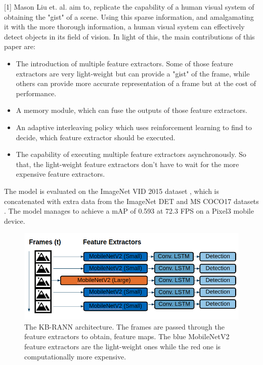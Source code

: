 \documentclass[conference]{IEEEtran}
\begin{document}
[1] Mason Liu et. al. aim to, replicate the capability of a human visual system of obtaining the "gist" of a scene. Using this sparse information, and amalgamating it with the more thorough information, a human visual system can effectively detect objects in its field of vision. In light of this, the main contributions of this paper are:
\begin{itemize}
	\item The introduction of multiple feature extractors. Some of those feature extractors are very light-weight but can provide a "gist" of the frame, while others can provide more accurate representation of a frame but at the cost of performance.
	\item A memory module, which can fuse the outputs of those feature extractors.
	\item An adaptive interleaving policy which uses reinforcement learning to find to decide, which feature extractor should be executed.
	\item The capability of executing multiple feature extractors asynchronously. So that, the light-weight feature extractors don't have to wait for the more expensive feature extractors.
\end{itemize}
The model is evaluated on the ImageNet VID 2015 dataset \cite{b35}, which is concatenated with extra data from the ImageNet DET \cite{b35} and MS COCO17 datasets \cite{b31}. The model manages to achieve a mAP of 0.593 at 72.3 FPS on a Pixel3 mobile device. \newline

\begin{figure}[h]
\includegraphics[width=\columnwidth]{looking-fast-and-slow-architecture}
\caption{The KB-RANN architecture. The frames are passed through the feature extractors to obtain, feature maps. The blue MobileNetV2 feature extractors are the light-weight ones while the red one is computationally more expensive.}
\end{figure}
\end{document}
